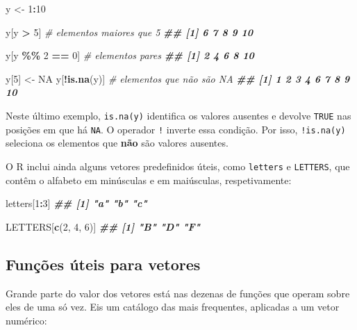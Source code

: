 \documentclass[
  portuguese,
  11pt,
  openany]{book}
\newenvironment{Shaded}{\begin{snugshade}}{\end{snugshade}}
\newcommand{\CommentTok}[1]{\textcolor[rgb]{0.56,0.35,0.01}{\textit{#1}}}
\newcommand{\ConstantTok}[1]{\textcolor[rgb]{0.56,0.35,0.01}{#1}}
\newcommand{\DecValTok}[1]{\textcolor[rgb]{0.00,0.00,0.81}{#1}}
\newcommand{\DocumentationTok}[1]{\textcolor[rgb]{0.56,0.35,0.01}{\textbf{\textit{#1}}}}
\newcommand{\FunctionTok}[1]{\textcolor[rgb]{0.13,0.29,0.53}{\textbf{#1}}}
\newcommand{\NormalTok}[1]{#1}
\newcommand{\OtherTok}[1]{\textcolor[rgb]{0.56,0.35,0.01}{#1}}
\newcommand{\SpecialCharTok}[1]{\textcolor[rgb]{0.81,0.36,0.00}{\textbf{#1}}}
\begin{document}
\begin{Shaded}
\begin{Highlighting}[]
\NormalTok{y }\OtherTok{\textless{}{-}} \DecValTok{1}\SpecialCharTok{:}\DecValTok{10}

\NormalTok{y[y }\SpecialCharTok{\textgreater{}} \DecValTok{5}\NormalTok{]           }\CommentTok{\# elementos maiores que 5}
\DocumentationTok{\#\# [1]  6  7  8  9 10}

\NormalTok{y[y }\SpecialCharTok{\%\%} \DecValTok{2} \SpecialCharTok{==} \DecValTok{0}\NormalTok{]     }\CommentTok{\# elementos pares}
\DocumentationTok{\#\# [1]  2  4  6  8 10}

\NormalTok{y[}\DecValTok{5}\NormalTok{] }\OtherTok{\textless{}{-}} \ConstantTok{NA}
\NormalTok{y[}\SpecialCharTok{!}\FunctionTok{is.na}\NormalTok{(y)]       }\CommentTok{\# elementos que não são NA}
\DocumentationTok{\#\# [1]  1  2  3  4  6  7  8  9 10}
\end{Highlighting}
\end{Shaded}

Neste último exemplo, \texttt{is.na(y)} identifica os valores ausentes e devolve \texttt{TRUE} nas posições em que há \texttt{NA}. O operador \texttt{!} inverte essa condição. Por isso, \texttt{!is.na(y)} seleciona os elementos que \textbf{não} são valores ausentes.

O R inclui ainda alguns vetores predefinidos úteis, como \texttt{letters} e \texttt{LETTERS}, que contêm o alfabeto em minúsculas e em maiúsculas, respetivamente:

\begin{Shaded}
\begin{Highlighting}[]
\NormalTok{letters[}\DecValTok{1}\SpecialCharTok{:}\DecValTok{3}\NormalTok{]}
\DocumentationTok{\#\# [1] "a" "b" "c"}

\NormalTok{LETTERS[}\FunctionTok{c}\NormalTok{(}\DecValTok{2}\NormalTok{, }\DecValTok{4}\NormalTok{, }\DecValTok{6}\NormalTok{)]}
\DocumentationTok{\#\# [1] "B" "D" "F"}
\end{Highlighting}
\end{Shaded}

\subsection{Funções úteis para vetores}\label{funuxe7uxf5es-uxfateis-para-vetores}

Grande parte do valor dos vetores está nas dezenas de funções que operam sobre eles de uma só vez. Eis um catálogo das mais frequentes, aplicadas a um vetor numérico:
\end{document}

